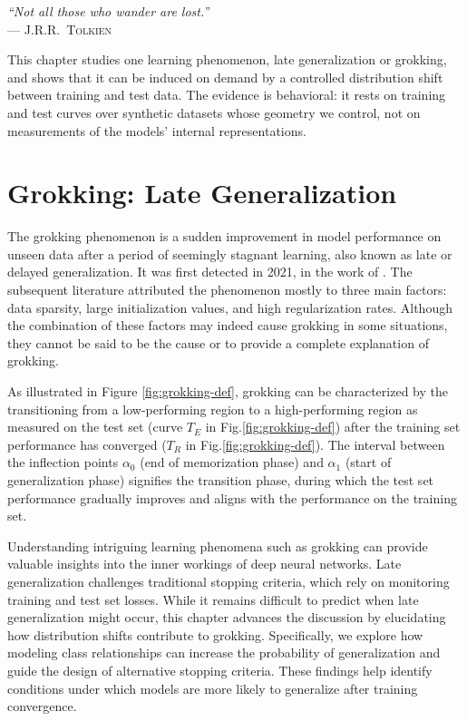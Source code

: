 ﻿\documentclass[../ppgc-tese.tex]{subfiles}
\begin{document}
\begin{flushright}
\mbox{}%
{\sffamily\itshape
``Not all those who wander are lost.'' \\}
--- \textsc{J.R.R.~Tolkien}
\end{flushright}

This chapter studies one learning phenomenon, late generalization or grokking, and shows that it can be induced on demand by a controlled distribution shift between training and test data. The evidence is behavioral: it rests on training and test curves over synthetic datasets whose geometry we control, not on measurements of the models' internal representations.

\section{Grokking: Late Generalization}
\label{sec:grokking}
The grokking phenomenon is a sudden improvement in model performance on unseen data after a period of seemingly stagnant learning, also known as late or delayed generalization. It was first detected in 2021, in the work of \cite{Grokking}. The subsequent literature attributed the phenomenon mostly to three main factors: data sparsity, large initialization values, and high regularization rates. Although the combination of these factors may indeed cause grokking in some situations, they cannot be said to be the cause or to provide a complete explanation of grokking.

As illustrated in Figure \ref{fig:grokking-def}, grokking can be characterized by the transitioning from a low-performing region to a high-performing region as measured on the test set (curve $T_E$ in Fig.\ref{fig:grokking-def}) after the training set performance has converged ($T_R$ in Fig.\ref{fig:grokking-def}). The interval between the inflection points $\alpha_0$ (end of memorization phase) and $\alpha_1$ (start of generalization phase) signifies the transition phase, during which the test set performance gradually improves and aligns with the performance on the training set. 

Understanding intriguing learning phenomena such as grokking can provide valuable insights into the inner workings of deep neural networks. Late generalization challenges traditional stopping criteria, which rely on monitoring training and test set losses. While it remains difficult to predict when late generalization might occur, this chapter advances the discussion by elucidating how distribution shifts contribute to grokking. Specifically, we explore how modeling class relationships can increase the probability of generalization and guide the design of alternative stopping criteria. These findings help identify conditions under which models are more likely to generalize after training convergence.
\end{document}

